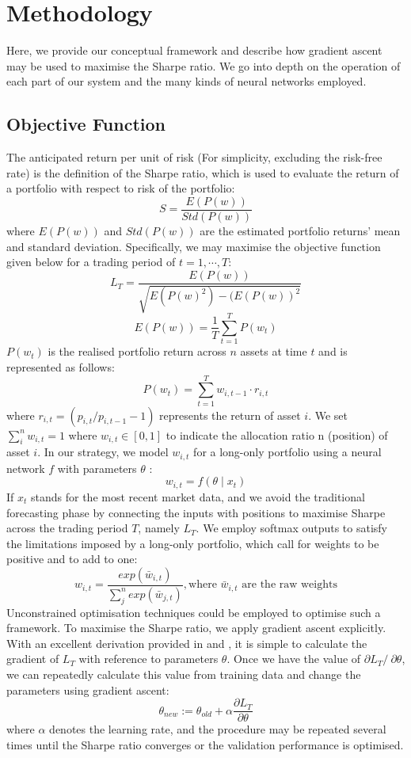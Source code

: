 \chapter{Methodology}
Here, we provide our conceptual framework and describe how gradient ascent may be used to maximise the Sharpe ratio. We go into depth on the operation of each part of our system and the many kinds of neural networks employed.
\section{Objective Function} \label{objective function}
The anticipated return per unit of risk (For simplicity, excluding the risk-free rate) is the definition of the Sharpe ratio, which is used to evaluate the return of a portfolio with respect to risk of the portfolio:
\[S = \frac{E(P(w))}{Std(P(w))}\]
where \(E(P(w))\) and \(Std(P(w))\) are the estimated portfolio returns' mean and standard deviation.
Specifically, we may maximise the objective function given below for a trading period of \(t = 1, \cdots, T\):
\[L_{T} = \frac{E(P(w))}{\sqrt{E(P(w)^{2}) - (E(P(w))^{2}}}\]
\[E(P(w)) = \frac{1}{T}\sum_{t = 1}^{T} P(w_{t})
\]
\(P(w_{t})\) is the realised portfolio return across \(n\) assets at time \(t\) and is represented as follows:
\[P(w_{t}) = \sum_{t = 1}^{T} w_{i, t-1}\cdot r_{i,t}
\]
where \(r_{i,t} = (p_{i,t}/p_{i,t-1} - 1)\) represents the return of asset $i$. We set \(\sum_{i}^{n}w_{i,t} = 1\) where \(w_{i,t} \in [0,1]\) to indicate the allocation ratio n (position) of asset $i$. In our strategy, we model $w_{i,t}$ for a long-only portfolio using a neural network $f$ with parameters $\theta$ : 
\[w_{i,t} = f(\theta\mid x_{t})\]
If $x_{t}$ stands for the most recent market data, and we avoid the traditional forecasting phase by connecting the inputs with positions to maximise Sharpe across the trading period $T$, namely $L_{T}$. We employ softmax outputs to satisfy the limitations imposed by a long-only portfolio, which call for weights to be positive and to add to one:
\[w_{i,t} = \frac{exp(\bar{w}_{i,t})}{\sum_{j}^{n}exp(\bar{w}_{j,t})}, \textrm{where } \bar{w}_{i,t} \textrm{ are the raw weights}\]
Unconstrained optimisation techniques could be employed to optimise such a framework. To maximise the Sharpe ratio, we apply gradient ascent explicitly. With an excellent derivation provided in \cite{Moody1998} and \cite{Molina2006}, it is simple to calculate the gradient of $L_{T}$ with reference to parameters $\theta$. Once we have the value of $\partial L_{T} /\ \partial \theta$, we can repeatedly calculate this value from training data and change the parameters using gradient ascent:
\[\theta_{new} := \theta_{old} + \alpha\frac{\partial L_{T}}{\partial \theta}\]
where $\alpha$ denotes the learning rate, and the procedure may be repeated several times until the Sharpe ratio converges or the validation performance is optimised.
